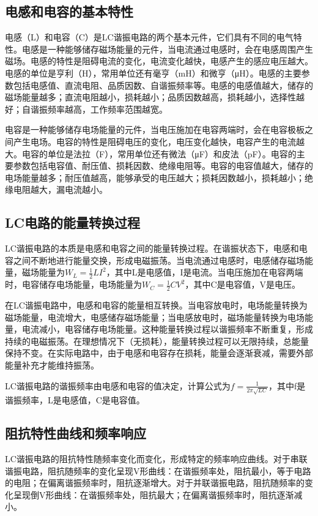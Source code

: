\documentclass[12pt,UTF8]{ctexbook}
\begin{document}
\subsection{电感和电容的基本特性}

电感（L）和电容（C）是LC谐振电路的两个基本元件，它们具有不同的电气特性。电感是一种能够储存磁场能量的元件，当电流通过电感时，会在电感周围产生磁场。电感的特性是阻碍电流的变化，电流变化越快，电感产生的感应电压越大。电感的单位是亨利（H），常用单位还有毫亨（mH）和微亨（μH）。电感的主要参数包括电感值、直流电阻、品质因数、自谐振频率等。电感的电感值越大，储存的磁场能量越多；直流电阻越小，损耗越小；品质因数越高，损耗越小，选择性越好；自谐振频率越高，工作频率范围越宽。

电容是一种能够储存电场能量的元件，当电压施加在电容两端时，会在电容极板之间产生电场。电容的特性是阻碍电压的变化，电压变化越快，电容产生的电流越大。电容的单位是法拉（F），常用单位还有微法（μF）和皮法（pF）。电容的主要参数包括电容值、耐压值、损耗因数、绝缘电阻等。电容的电容值越大，储存的电场能量越多；耐压值越高，能够承受的电压越大；损耗因数越小，损耗越小；绝缘电阻越大，漏电流越小。

\subsection{LC电路的能量转换过程}

LC谐振电路的本质是电感和电容之间的能量转换过程。在谐振状态下，电感和电容之间不断地进行能量交换，形成电磁振荡。当电流通过电感时，电感储存磁场能量，磁场能量为$W_L = \frac{1}{2}LI^2$，其中L是电感值，I是电流。当电压施加在电容两端时，电容储存电场能量，电场能量为$W_C = \frac{1}{2}CV^2$，其中C是电容值，V是电压。

在LC谐振电路中，电感和电容的能量相互转换。当电容放电时，电场能量转换为磁场能量，电流增大，电感储存磁场能量；当电感放电时，磁场能量转换为电场能量，电流减小，电容储存电场能量。这种能量转换过程以谐振频率不断重复，形成持续的电磁振荡。在理想情况下（无损耗），能量转换过程可以无限持续，总能量保持不变。在实际电路中，由于电感和电容存在损耗，能量会逐渐衰减，需要外部能量补充才能维持振荡。

LC谐振电路的谐振频率由电感和电容的值决定，计算公式为$f = \frac{1}{2\pi\sqrt{LC}}$，其中f是谐振频率，L是电感值，C是电容值。

\subsection{阻抗特性曲线和频率响应}

LC谐振电路的阻抗特性随频率变化而变化，形成特定的频率响应曲线。对于串联谐振电路，阻抗随频率的变化呈现V形曲线：在谐振频率处，阻抗最小，等于电路的电阻；在偏离谐振频率时，阻抗逐渐增大。对于并联谐振电路，阻抗随频率的变化呈现倒V形曲线：在谐振频率处，阻抗最大；在偏离谐振频率时，阻抗逐渐减小。
\end{document}
